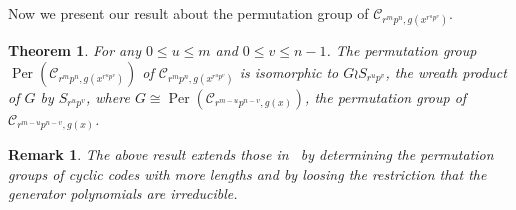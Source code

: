 \documentclass[journal,12pt,onecolumn]{IEEEtran}
\newtheorem{theorem}{Theorem}
\newtheorem{remark}{Remark}
\begin{document}
Now we present our result about the permutation group of $\mathcal{C}_{r^mp^n,g(x^{r^up^v})}$. 

 
\begin{theorem}\label{L_rp}
    For any $0\le u\le m$ and $0\le v\le n-1$. The permutation group $\operatorname{Per}(\mathcal{C}_{r^mp^n,g(x^{r^up^v})})$ of $\mathcal{C}_{r^mp^n,g(x^{r^up^v})}$ is isomorphic to $G \wr S_{r^up^v}$, the wreath product of \(G\) by \(S_{r^up^v}\), where $G\cong \operatorname{Per}(\mathcal{C}_{r^{m-u}p^{n-v},g(x)})$, the permutation group of $\mathcal{C}_{r^{m-u}p^{n-v},g(x)}$. 
\end{theorem}

 

\begin{remark}
    The above result extends those in~\cite{maAutomorphismGroupsBinary2025} by determining the permutation groups of cyclic codes with more lengths and by loosing the restriction that the generator polynomials are irreducible.
\end{remark}
 
\end{document}
